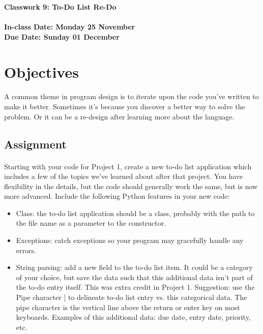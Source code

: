 \documentclass[letter,10pt]{article}
\begin{document}
    
    \huge
    \textbf{Classwork 9: To-Do List Re-Do}
    \normalsize
    \\ ~~ \\
    \textbf{In-class Date: Monday 25 November} \\
    \textbf{Due Date: Sunday 01 December}
    
    \section*{Objectives}
    \paragraph{}A common theme in program design is to iterate upon the code you've written to make it better. Sometimes it's because you discover a better way to solve the problem. Or it can be a re-design after learning more about the language.
    
    \subsection*{Assignment}
    \paragraph{}Starting with your code for Project 1, create a new to-do list application which includes a few of the topics we've learned about after that project. You have flexibility in the details, but the code should generally work the same, but is now more advanced. Include the following Python features in your new code:
    \begin{itemize}
        \item Class: the to-do list application should be a class, probably with the path to the file name as a parameter to the constructor.
        \item Exceptions: catch exceptions so your program may gracefully handle any errors.
        \item String parsing: add a new field to the to-do list item. It could be a category of your choice, but save the data such that this additional data isn't part of the to-do entry itself. This was extra credit in Project 1. Suggestion: use the Pipe character | to delineate to-do list entry vs. this categorical data. The pipe character is the vertical line above the return or enter key on most keyboards. Examples of this additional data: due date, entry date, priority, etc.
    \end{itemize}
    
\end{document}
